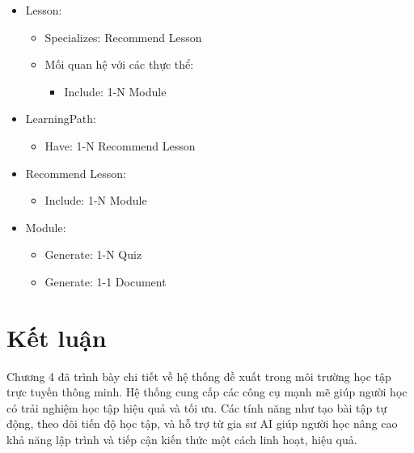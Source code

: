 \begin{itemize}
    \item Lesson:
    \begin{itemize}
        \item Specializes: Recommend Lesson
        \item Mối quan hệ với các thực thể:
        \begin{itemize}
            \item Include: 1-N Module
        \end{itemize}
    \end{itemize}

    \item LearningPath:
    \begin{itemize}
        \item Have: 1-N Recommend Lesson
    \end{itemize}

    \item Recommend Lesson:
    \begin{itemize}
        \item Include: 1-N Module
    \end{itemize}

    \item Module:
    \begin{itemize}
        \item Generate: 1-N Quiz
        \item Generate: 1-1 Document
    \end{itemize}
\end{itemize}

\section{Kết luận}
Chương 4 đã trình bày chi tiết về hệ thống đề xuất trong môi trường học tập trực tuyến thông minh. Hệ thống cung cấp các công cụ mạnh mẽ giúp người học có trải nghiệm học tập hiệu quả và tối ưu. Các tính năng như tạo bài tập tự động, theo dõi tiến độ học tập, và hỗ trợ từ gia sư AI giúp người học nâng cao khả năng lập trình và tiếp cận kiến thức một cách linh hoạt, hiệu quả.
